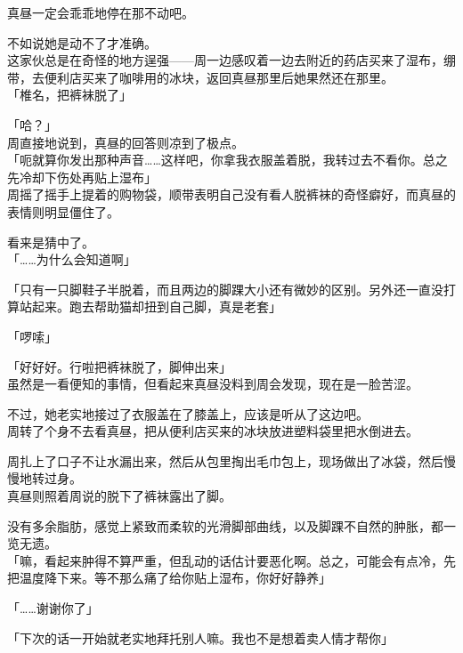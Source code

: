 真昼一定会乖乖地停在那不动吧。

不如说她是动不了才准确。\\

这家伙总是在奇怪的地方逞强——周一边感叹着一边去附近的药店买来了湿布，绷带，去便利店买来了咖啡用的冰块，返回真昼那里后她果然还在那里。\\

「椎名，把裤袜脱了」

「哈？」\\

周直接地说到，真昼的回答则凉到了极点。\\

「呃就算你发出那种声音……这样吧，你拿我衣服盖着脱，我转过去不看你。总之先冷却下伤处再贴上湿布」\\

周摇了摇手上提着的购物袋，顺带表明自己没有看人脱裤袜的奇怪癖好，而真昼的表情则明显僵住了。

看来是猜中了。\\

「……为什么会知道啊」

「只有一只脚鞋子半脱着，而且两边的脚踝大小还有微妙的区别。另外还一直没打算站起来。跑去帮助猫却扭到自己脚，真是老套」

「啰嗦」

「好好好。行啦把裤袜脱了，脚伸出来」\\

虽然是一看便知的事情，但看起来真昼没料到周会发现，现在是一脸苦涩。

不过，她老实地接过了衣服盖在了膝盖上，应该是听从了这边吧。\\

周转了个身不去看真昼，把从便利店买来的冰块放进塑料袋里把水倒进去。

周扎上了口子不让水漏出来，然后从包里掏出毛巾包上，现场做出了冰袋，然后慢慢地转过身。\\

真昼则照着周说的脱下了裤袜露出了脚。

没有多余脂肪，感觉上紧致而柔软的光滑脚部曲线，以及脚踝不自然的肿胀，都一览无遗。\\

「嘛，看起来肿得不算严重，但乱动的话估计要恶化啊。总之，可能会有点冷，先把温度降下来。等不那么痛了给你贴上湿布，你好好静养」

「……谢谢你了」

「下次的话一开始就老实地拜托别人嘛。我也不是想着卖人情才帮你」\\

